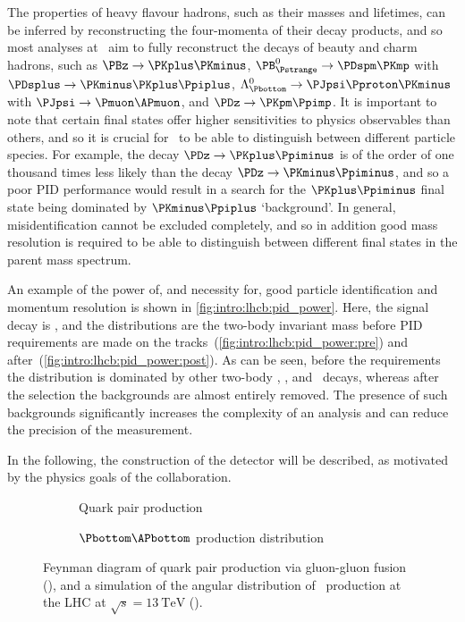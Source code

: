 The properties of heavy flavour hadrons, such as their masses and lifetimes, 
can be inferred by reconstructing the four-momenta of their decay products, and 
so most analyses at \lhcb\ aim to fully reconstruct the decays of beauty and 
charm hadrons, such as $\decay{\PBz}{\PKplus\PKminus}$, 
$\decay{\PBs}{\PDspm\PKmp}$ with $\decay{\PDsplus}{\PKminus\PKplus\Ppiplus}$, 
$\decay{\PLambdab}{\PJpsi\Pproton\PKminus}$ with 
$\decay{\PJpsi}{\Pmuon\APmuon}$, and $\decay{\PDz}{\PKpm\Ppimp}$.
It is important to note that certain final states offer higher sensitivities to 
physics observables than others, and so it is crucial for \lhcb\ to be able to 
distinguish between different particle species.
For example, the decay $\decay{\PDz}{\PKplus\Ppiminus}$ is of the order of one 
thousand times less likely than the decay $\decay{\PDz}{\PKminus\Ppiminus}$, 
and so a poor \ac{PID} performance would result in a search for the 
$\PKplus\Ppiminus$ final state being dominated by $\PKminus\Ppiplus$ 
`background'.
In general, misidentification cannot be excluded completely, and so in addition 
good mass resolution is required to be able to distinguish between different 
final states in the parent mass spectrum.

An example of the power of, and necessity for, good particle identification and 
momentum resolution is shown in \cref{fig:intro:lhcb:pid_power}.
Here, the signal decay is \decay{\PBzero}{\pippim}, and the distributions are 
the two-body invariant mass before \ac{PID} requirements are made on the 
tracks~(\ref{fig:intro:lhcb:pid_power:pre}) and 
after~(\ref{fig:intro:lhcb:pid_power:post}).
As can be seen, before the requirements the distribution is dominated by other 
two-body \PBzero, \PBs, and \PLambdab\ decays, whereas after the selection the 
backgrounds are almost entirely removed.
The presence of such backgrounds significantly increases the complexity of an 
analysis and can reduce the precision of the measurement.

In the following, the construction of the detector will be described, as 
motivated by the physics goals of the collaboration.

\begin{figure}
  \begin{subfigure}[b]{0.4\textwidth}
    \centering
    
    \caption{Quark pair production}
    \label{fig:intro:lhcb:hf_production:gg_fusion}
  \end{subfigure}
  \begin{subfigure}[b]{0.6\textwidth}
    
    \caption{$\Pbottom\APbottom$ production distribution}
    \label{fig:intro:lhcb:hf_production:bbbar_angles}
  \end{subfigure}
  \caption{%
    Feynman diagram of quark pair production via gluon-gluon fusion 
    (), and a simulation of the 
    angular distribution of \bbbar\ production at the \ac{LHC} at $\sqrt{s} = 
    \SI{13}{\TeV}$ ().
  }
  \label{fig:intro:lhcb:hf_production}
\end{figure}

